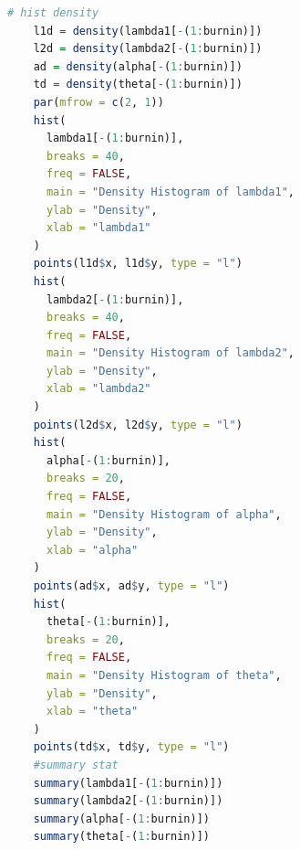 \documentclass[11pt]{article}
\begin{document}
\begin{lstlisting}[language=R]
    # hist density
    l1d = density(lambda1[-(1:burnin)])
    l2d = density(lambda2[-(1:burnin)])
    ad = density(alpha[-(1:burnin)])
    td = density(theta[-(1:burnin)])
    par(mfrow = c(2, 1))
    hist(
      lambda1[-(1:burnin)],
      breaks = 40,
      freq = FALSE,
      main = "Density Histogram of lambda1",
      ylab = "Density",
      xlab = "lambda1"
    )
    points(l1d$x, l1d$y, type = "l")
    hist(
      lambda2[-(1:burnin)],
      breaks = 40,
      freq = FALSE,
      main = "Density Histogram of lambda2",
      ylab = "Density",
      xlab = "lambda2"
    )
    points(l2d$x, l2d$y, type = "l")
    hist(
      alpha[-(1:burnin)],
      breaks = 20,
      freq = FALSE,
      main = "Density Histogram of alpha",
      ylab = "Density",
      xlab = "alpha"
    )
    points(ad$x, ad$y, type = "l")
    hist(
      theta[-(1:burnin)],
      breaks = 20,
      freq = FALSE,
      main = "Density Histogram of theta",
      ylab = "Density",
      xlab = "theta"
    )
    points(td$x, td$y, type = "l")
    #summary stat
    summary(lambda1[-(1:burnin)])
    summary(lambda2[-(1:burnin)])
    summary(alpha[-(1:burnin)])
    summary(theta[-(1:burnin)])
\end{lstlisting}

\end{document}
